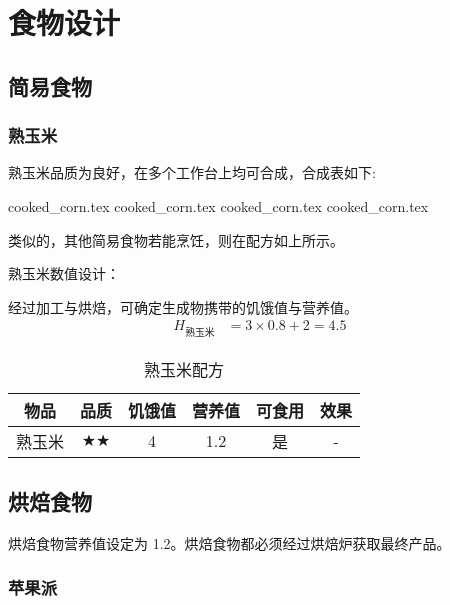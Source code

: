 \section{食物设计}

\subsection{简易食物}

\subsubsection{熟玉米}

熟玉米品质为良好，在多个工作台上均可合成，合成表如下:

{cooked_corn.tex}
{cooked_corn.tex}
{cooked_corn.tex}
{cooked_corn.tex}

类似的，其他简易食物若能烹饪，则在配方如上所示。

熟玉米数值设计：

经过加工与烘焙，可确定生成物携带的饥饿值与营养值。
\begin{equation}
    \begin{aligned}
        H_{\text{熟玉米}} & = 3 \times 0.8 + 2 = 4.5 \nonumber
    \end{aligned}
\end{equation}

\begin{table}[H]
    \centering
    \caption{熟玉米配方}
    \setlength{\tabcolsep}{4mm}
    \begin{tabular}{c|ccc|cc}
        \toprule
        \textbf{物品} & \textbf{品质} & \textbf{饥饿值} & \textbf{营养值} & \textbf{可食用} & \textbf{效果}\\
        \midrule
        熟玉米 & $\bigstar \bigstar$ & 4 & 1.2 & 是 & - \\
        \bottomrule
    \end{tabular}
\end{table}


\subsection{烘焙食物}

烘焙食物营养值设定为 1.2。烘焙食物都必须经过烘焙炉获取最终产品。

\subsubsection{苹果派}

